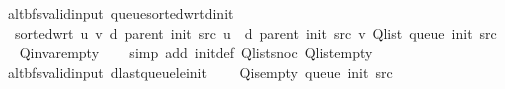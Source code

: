 \begin{isabellebody}
\isamarkupfalse%
%
\endisatagproof
{\isafoldproof}%
%
\isadelimproof
\isanewline
%
\endisadelimproof
%
\isadeliminvisible
\isanewline
%
\endisadeliminvisible
%
\isataginvisible
{}\isamarkupfalse%
\ {\isacharparenleft}{\kern0pt}\ alt{\isacharunderscore}{\kern0pt}bfs{\isacharunderscore}{\kern0pt}valid{\isacharunderscore}{\kern0pt}input{\isacharparenright}{\kern0pt}\ queue{\isacharunderscore}{\kern0pt}sorted{\isacharunderscore}{\kern0pt}wrt{\isacharunderscore}{\kern0pt}d{\isacharunderscore}{\kern0pt}init{\isacharcolon}{\kern0pt}\isanewline
\ \ \ {\isachardoublequoteopen}sorted{\isacharunderscore}{\kern0pt}wrt\ {\isacharparenleft}{\kern0pt}{\isasymlambda}u\ v{\isachardot}{\kern0pt}\ d\ {\isacharparenleft}{\kern0pt}parent\ {\isacharparenleft}{\kern0pt}init\ src{\isacharparenright}{\kern0pt}{\isacharparenright}{\kern0pt}\ u\ {\isasymle}\ d\ {\isacharparenleft}{\kern0pt}parent\ {\isacharparenleft}{\kern0pt}init\ src{\isacharparenright}{\kern0pt}{\isacharparenright}{\kern0pt}\ v{\isacharparenright}{\kern0pt}\ {\isacharparenleft}{\kern0pt}Q{\isacharunderscore}{\kern0pt}list\ {\isacharparenleft}{\kern0pt}queue\ {\isacharparenleft}{\kern0pt}init\ src{\isacharparenright}{\kern0pt}{\isacharparenright}{\kern0pt}{\isacharparenright}{\kern0pt}{\isachardoublequoteclose}%
\endisataginvisible
{\isafoldinvisible}%
%
\isadeliminvisible
\isanewline
%
\endisadeliminvisible
%
\isadelimproof
\ \ %
\endisadelimproof
%
\isatagproof
{}\isamarkupfalse%
\ Q{\isachardot}{\kern0pt}invar{\isacharunderscore}{\kern0pt}empty\isanewline
\ \ \isamarkupfalse%
\ {\isacharparenleft}{\kern0pt}simp\ add{\isacharcolon}{\kern0pt}\ init{\isacharunderscore}{\kern0pt}def\ Q{\isachardot}{\kern0pt}list{\isacharunderscore}{\kern0pt}snoc\ Q{\isachardot}{\kern0pt}list{\isacharunderscore}{\kern0pt}empty{\isacharparenright}{\kern0pt}%
\endisatagproof
{\isafoldproof}%
%
\isadelimproof
\isanewline
%
\endisadelimproof
%
\isadeliminvisible
\isanewline
%
\endisadeliminvisible
%
\isataginvisible
{}\isamarkupfalse%
\ {\isacharparenleft}{\kern0pt}\ alt{\isacharunderscore}{\kern0pt}bfs{\isacharunderscore}{\kern0pt}valid{\isacharunderscore}{\kern0pt}input{\isacharparenright}{\kern0pt}\ d{\isacharunderscore}{\kern0pt}last{\isacharunderscore}{\kern0pt}queue{\isacharunderscore}{\kern0pt}le{\isacharunderscore}{\kern0pt}init{\isacharcolon}{\kern0pt}\isanewline
\ \ \ {\isachardoublequoteopen}{\isasymnot}\ Q{\isacharunderscore}{\kern0pt}is{\isacharunderscore}{\kern0pt}empty\ {\isacharparenleft}{\kern0pt}queue\ {\isacharparenleft}{\kern0pt}init\ src{\isacharparenright}{\kern0pt}{\isacharparenright}{\kern0pt}{\isachardoublequoteclose}\isanewline

\end{isabellebody}
